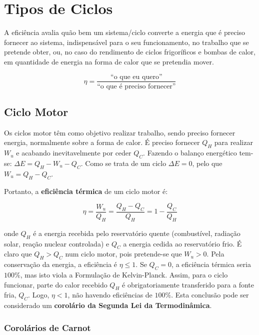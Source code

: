 \section{Tipos de Ciclos}

A eficiência avalia quão bem um sistema/ciclo converte a energia que é preciso fornecer ao sistema, indispensável para o seu funcionamento, no trabalho que se pretende obter, ou, no caso do rendimento de ciclos frigoríficos e bombas de calor, em quantidade de energia na forma de calor que se pretendia mover.

\begin{equation*}
    \eta = \frac{\text{``o que eu quero''}}{\text{``o que é preciso fornecer''}}
\end{equation*}

\subsection{Ciclo Motor}

Os ciclos motor têm como objetivo realizar trabalho, sendo preciso fornecer energia, normalmente sobre a forma de calor.
É preciso fornecer $Q_H$ para realizar $W_u$ e acabando inevitavelmente por ceder $Q_C$. Fazendo o balanço energético tem-se: $\Delta E = Q_H - W_u - Q_C$. Como se trata de um ciclo $\Delta E = 0$, pelo que $W_u = Q_H - Q_C$.

Portanto, a \textbf{eficiência térmica} de um ciclo motor é:

\begin{equation}
    \eta = \frac{W_u}{Q_H} = \frac{Q_H - Q_C}{Q_H}  = 1 - \frac{Q_C}{Q_H}
\end{equation}

onde $Q_H$ é a energia recebida pelo reservatório quente (combustível, radiação solar, reação nuclear controlada) e $Q_C$ a energia cedida ao reservatório frio. É claro que $Q_H > Q_C$ num ciclo motor, pois pretende-se que $W_u > 0$. Pela conservação da energia, a eficiência é $\eta \leq 1$. Se $Q_C = 0$, a eficiência térmica seria $100\%$, mas isto viola a Formulação de Kelvin-Planck. Assim, para o ciclo funcionar, parte do calor recebido $Q_H$ é obrigatoriamente transferido para a fonte fria, $Q_C$. Logo, $\eta < 1$, não havendo eficiências de $100\%$.
Esta conclusão pode ser considerado um \textbf{corolário da Segunda Lei da Termodinâmica}.

\subsubsection{Corolários de Carnot}

